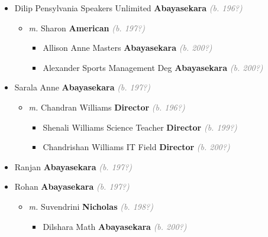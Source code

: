 \documentclass[10pt, openany]{book}
\begin{document}
\begin{itemize}
{\begin{itemize}
{\begin{itemize}
{\begin{itemize}
\item{Dilip  Pensylvania Speakers Unlimited \textbf{Abayasekara} \textcolor{gray}{\textit{(b. 196?)}}
\begin{itemize}
\item{\textit{m.} Sharon \textbf{American} \textcolor{gray}{\textit{(b. 197?)}}   \label{couple:00003373:00003374} \begin{itemize}
\item{Allison Anne  Masters \textbf{Abayasekara} \textcolor{gray}{\textit{(b. 200?)}}
   }
\item{Alexander  Sports Management Deg \textbf{Abayasekara} \textcolor{gray}{\textit{(b. 200?)}}
    }
\end{itemize}}
\end{itemize}
    }
\item{Sarala Anne  \textbf{Abayasekara} \textcolor{gray}{\textit{(b. 197?)}}
\begin{itemize}
\item{\textit{m.} Chandran Williams \textbf{Director} \textcolor{gray}{\textit{(b. 196?)}}   \label{couple:00003354:00003355} \begin{itemize}
\item{Shenali Williams Science Teacher \textbf{Director} \textcolor{gray}{\textit{(b. 199?)}}
    }
\item{Chandrishan Williams IT Field \textbf{Director} \textcolor{gray}{\textit{(b. 200?)}}
    }
\end{itemize}}
\end{itemize}
  }
\item{Ranjan  \textbf{Abayasekara} \textcolor{gray}{\textit{(b. 197?)}}
 }
\item{Rohan  \textbf{Abayasekara} \textcolor{gray}{\textit{(b. 197?)}}
\begin{itemize}
\item{\textit{m.} Suvendrini \textbf{Nicholas} \textcolor{gray}{\textit{(b. 198?)}}   \label{couple:00003365:00003366} \begin{itemize}
\item{Dilshara  Math \textbf{Abayasekara} \textcolor{gray}{\textit{(b. 200?)}}
}
\end{itemize}}
\end{itemize}}
\end{itemize}}
\end{itemize}}
\end{itemize}}
\end{itemize}
\end{document}
